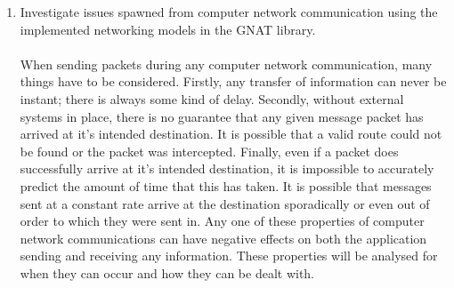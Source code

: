 \begin{enumerate}
\item Investigate issues spawned from computer network communication using the implemented networking models in the GNAT library.
  \\\\
  When sending packets during any computer network communication, many things have to be considered. Firstly, any transfer of information can never be instant; there is always some kind of delay. Secondly, without external systems in place, there is no guarantee that any given message packet has arrived at it's intended destination. It is possible that a valid route could not be found or the packet was intercepted. Finally, even if a packet does successfully arrive at it's intended destination, it is impossible to accurately predict the amount of time that this has taken. It is possible that messages sent at a constant rate arrive at the destination sporadically or even out of order to which they were sent in.
  Any one of these properties of computer network communications can have negative effects on both the application sending and receiving any information. These properties will be analysed for when they can occur and how they can be dealt with.
\end{enumerate}
